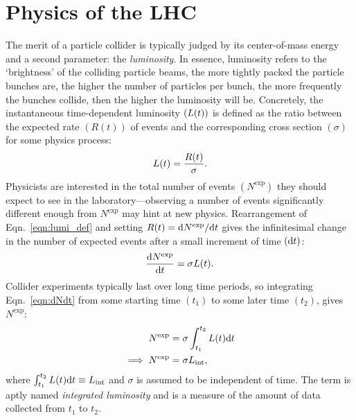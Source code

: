 


\section{Physics of the LHC}
The merit of a particle collider is typically judged by its center-of-mass energy and a second parameter: the \emph{luminosity}.
In essence, luminosity refers to the `brightness' of the colliding particle beams,
\ie the more tightly packed the particle bunches are, the higher the number of particles per bunch, the more frequently the bunches collide, then the higher the luminosity will be.
Concretely, the instantaneous time-dependent luminosity $(L(t))$ is defined as the ratio between the expected rate $\left( R(t) \right)$ of events and the corresponding cross section $(\sigma)$ for some physics process:
\begin{equation}
    L(t)= \frac{R(t)}{\sigma}.
    \label{eqn:lumi_def}
\end{equation}
Physicists are interested in the total number of events $\left( N^\text{exp} \right)$ they should expect to see in the laboratory---observing a number of events significantly different enough from $N^\text{exp}$ may hint at new physics.
Rearrangement of Eqn.~\ref{eqn:lumi_def} and setting $R(t) = \text{d}N^\text{exp} / \text{d}t$ gives the infinitesimal change in the number of expected events after a small increment of time $(\text{d}t)$:
\begin{equation}
    \frac{\text{d}N^\text{exp}}{\text{d}t} = \sigma L(t).
    \label{eqn:dNdt}
\end{equation}
Collider experiments typically last over long time periods, so integrating Eqn.~\ref{eqn:dNdt} from some starting time $\left( t_1 \right)$ to some later time $\left( t_2 \right)$, gives $N^\text{exp}$:
\begin{align*}
    N^\text{exp} &= \sigma \int_{t_1}^{t_2}{L(t) \text{d}t}
    \\
    \implies N^\text{exp} &= \sigma L_\text{int},
    \label{eqn:Nexp}
\end{align*}
where $\int_{t_1}^{t_2}{L(t) \text{d}t} \equiv L_\text{int}$ and $\sigma$ is assumed to be independent of time.
The term \lumiint is aptly named \emph{integrated luminosity} and is a measure of the amount of data collected from $t_1$ to $t_2$.

